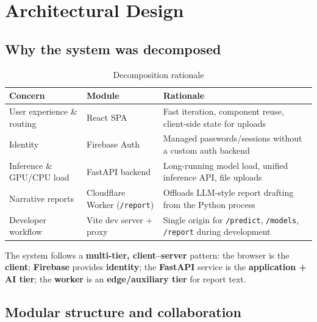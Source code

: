 \documentclass[12pt,a4paper]{report}
\begin{document}
\section{Architectural Design}
\label{sec:arch}

\subsection{Why the system was decomposed}

\begin{table}[htbp]
  \centering
  \small
  \caption{Decomposition rationale}
  \begin{tabular}{@{}p{}p{}p{}@{}}
    \toprule
    \textbf{Concern} & \textbf{Module} & \textbf{Rationale} \\
    \midrule
    User experience \& routing & React SPA & Fast iteration, component reuse, client-side state for uploads \\
    Identity & Firebase Auth & Managed passwords/sessions without a custom auth backend \\
    Inference \& GPU/CPU load & FastAPI backend & Long-running model load, unified inference API, file uploads \\
    Narrative reports & Cloudflare Worker (\texttt{/report}) & Offloads LLM-style report drafting from the Python process \\
    Developer workflow & Vite dev server + proxy & Single origin for \texttt{/predict}, \texttt{/models}, \texttt{/report} during development \\
    \bottomrule
  \end{tabular}
\end{table}

The system follows a \textbf{multi-tier, client--server} pattern: the browser is the \textbf{client}; \textbf{Firebase} provides \textbf{identity}; the \textbf{FastAPI} service is the \textbf{application + AI tier}; the \textbf{worker} is an \textbf{edge/auxiliary tier} for report text.

\subsection{Modular structure and collaboration}
\end{document}
